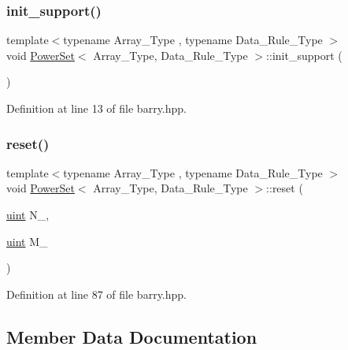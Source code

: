 \subsubsection{\texorpdfstring{init\+\_\+support()}{init\_support()}}
{\footnotesize\ttfamily template$<$typename Array\+\_\+\+Type , typename Data\+\_\+\+Rule\+\_\+\+Type $>$ \\
void \hyperlink{classbarry_1_1_power_set}{Power\+Set}$<$ Array\+\_\+\+Type, Data\+\_\+\+Rule\+\_\+\+Type $>$\+::init\+\_\+support (\begin{DoxyParamCaption}{ }\end{DoxyParamCaption})\hspace{0.3cm}{\ttfamily [inline]}}



Definition at line 13 of file barry.\+hpp.

\mbox{\label{classbarry_1_1_power_set_aba11dd8802cd2eb529c7c30b55994248}} 
\subsubsection{\texorpdfstring{reset()}{reset()}}
{\footnotesize\ttfamily template$<$typename Array\+\_\+\+Type , typename Data\+\_\+\+Rule\+\_\+\+Type $>$ \\
void \hyperlink{classbarry_1_1_power_set}{Power\+Set}$<$ Array\+\_\+\+Type, Data\+\_\+\+Rule\+\_\+\+Type $>$\+::reset (\begin{DoxyParamCaption}\item[{\hyperlink{namespacebarry_a11dfc53ddb4672278319aa04f1e09a6c}{uint}}]{N\+\_\+,  }\item[{\hyperlink{namespacebarry_a11dfc53ddb4672278319aa04f1e09a6c}{uint}}]{M\+\_\+ }\end{DoxyParamCaption})\hspace{0.3cm}{\ttfamily [inline]}}



Definition at line 87 of file barry.\+hpp.



\subsection{Member Data Documentation}
\mbox{\label{classbarry_1_1_power_set_a2bc42422f23546d55fef96f053c0c4ea}} 
